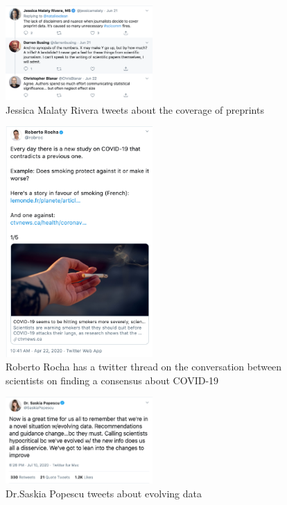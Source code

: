 \documentclass[acmsmall,authordraft]{acmart}
\begin{document}
\begin{figure}
  \includegraphics[width=0.5\textwidth]{Pictures/Appendix_Tweets/revera tweet.png}
  \caption{Jessica Malaty Rivera tweets about the coverage of preprints}
  \label{revera_tweet}
\end{figure}

\begin{figure}
  \includegraphics[width=0.5\textwidth]{Pictures/Appendix_Tweets/roberto rocha tweet.png}
  \caption{Roberto Rocha has a twitter thread on the conversation between scientists on finding a consensus about COVID-19}
  \label{roberto_rocha_tweet}
\end{figure}

\begin{figure}
  \includegraphics[width=0.5\textwidth]{Pictures/Appendix_Tweets/saskia popescu tweet.png}
  \caption{Dr.Saskia Popescu tweets about evolving data}
  \label{saskia_popescu_tweet}
\end{figure}
\end{document}
